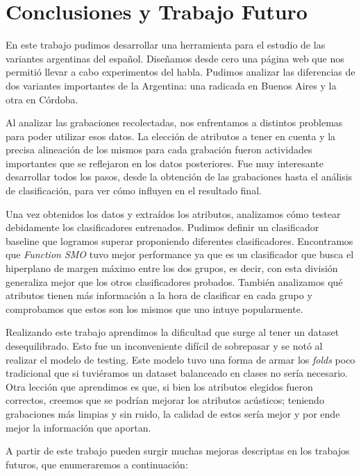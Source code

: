 \chapter{Conclusiones y Trabajo Futuro}

En este trabajo pudimos desarrollar una herramienta para el estudio de las variantes argentinas del español. Diseñamos desde cero una página web que nos permitió llevar a cabo experimentos del habla. Pudimos analizar las diferencias de dos variantes importantes de la Argentina: una radicada en Buenos Aires y la otra en Córdoba. 

Al analizar las grabaciones recolectadas, nos enfrentamos a distintos problemas para poder utilizar esos datos. La elección de atributos a tener en cuenta y la precisa alineación de los mismos para cada grabación fueron actividades importantes que se reflejaron en los datos posteriores. Fue muy interesante desarrollar todos los pasos, desde la obtención de las grabaciones hasta el análisis de clasificación, para ver cómo influyen en el resultado final.

Una vez obtenidos los datos y extraídos los atributos, analizamos cómo testear debidamente los clasificadores entrenados. Pudimos definir un clasificador baseline que logramos superar proponiendo diferentes clasificadores. Encontramos que \textit{Function SMO} tuvo mejor performance ya que es un clasificador que busca el hiperplano de margen máximo entre los dos grupos, es decir, con esta división generaliza mejor que los otros clasificadores probados. También analizamos qué atributos tienen más información a la hora de clasificar en cada grupo y comprobamos que estos son los mismos que uno intuye popularmente.

Realizando este trabajo aprendimos la dificultad que surge al tener un dataset desequilibrado. Esto fue un inconveniente difícil de sobrepasar y se notó al realizar el modelo de testing. Este modelo tuvo una forma de armar los \textit{folds} poco tradicional que si tuviéramos un dataset balanceado en clases no sería necesario. Otra lección que aprendimos es que, si bien los atributos elegidos fueron correctos, creemos que se podrían mejorar los atributos acústicos; teniendo grabaciones más limpias y sin ruido, la calidad de estos sería mejor y por ende mejor la información que aportan. 

A partir de este trabajo pueden surgir muchas mejoras descriptas en los trabajos futuros, que enumeraremos a continuación:

